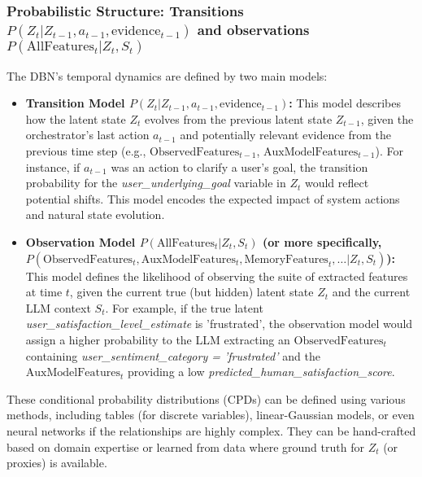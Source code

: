 \documentclass[11pt]{article}
\begin{document}
\subsubsection{Probabilistic Structure: Transitions $P(Z_t | Z_{t-1}, a_{t-1}, \text{evidence}_{t-1})$ and observations $P(\text{AllFeatures}_t | Z_t, S_t)$}
\label{sssec:dbn_structure}
The DBN's temporal dynamics are defined by two main models:
\begin{itemize}
    \item \textbf{Transition Model $P(Z_t | Z_{t-1}, a_{t-1}, \text{evidence}_{t-1})$:} This model describes how the latent state $Z_t$ evolves from the previous latent state $Z_{t-1}$, given the orchestrator's last action $a_{t-1}$ and potentially relevant evidence from the previous time step (e.g., $\text{ObservedFeatures}_{t-1}$, $\text{AuxModelFeatures}_{t-1}$). For instance, if $a_{t-1}$ was an action to clarify a user's goal, the transition probability for the \emph{user_underlying_goal} variable in $Z_t$ would reflect potential shifts. This model encodes the expected impact of system actions and natural state evolution.
    \item \textbf{Observation Model $P(\text{AllFeatures}_t | Z_t, S_t)$ (or more specifically, $P(\text{ObservedFeatures}_t, \text{AuxModelFeatures}_t, \text{MemoryFeatures}_t, \dots | Z_t, S_t)$):} This model defines the likelihood of observing the suite of extracted features at time $t$, given the current true (but hidden) latent state $Z_t$ and the current LLM context $S_t$. For example, if the true latent \emph{user_satisfaction_level_estimate} is 'frustrated', the observation model would assign a higher probability to the LLM extracting an $\text{ObservedFeatures}_t$ containing \emph{user_sentiment_category = 'frustrated'} and the $\text{AuxModelFeatures}_t$ providing a low \emph{predicted_human_satisfaction_score}.
\end{itemize}
These conditional probability distributions (CPDs) can be defined using various methods, including tables (for discrete variables), linear-Gaussian models, or even neural networks if the relationships are highly complex. They can be hand-crafted based on domain expertise or learned from data where ground truth for $Z_t$ (or proxies) is available.
\end{document}
